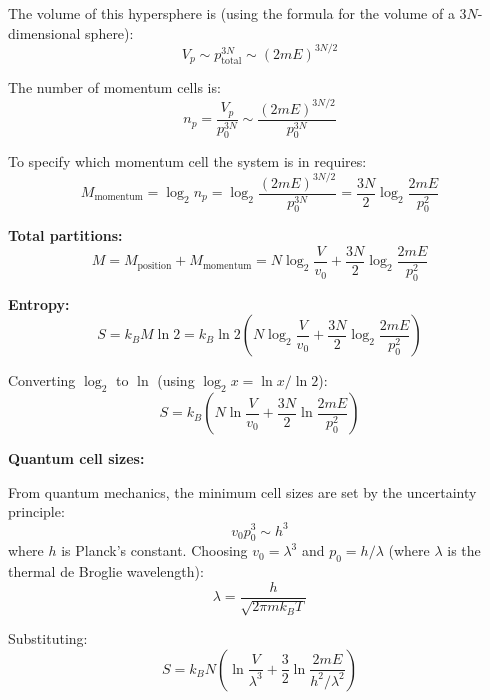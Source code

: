 \documentclass[twocolumn,10pt]{article}
\theoremstyle{definition}
\theoremstyle{remark}
\begin{document}
The volume of this hypersphere is (using the formula for the volume of a $3N$-dimensional sphere):
\begin{equation}
V_p \sim p_{\text{total}}^{3N} \sim (2mE)^{3N/2}
\end{equation}

The number of momentum cells is:
\begin{equation}
n_p = \frac{V_p}{p_0^{3N}} \sim \frac{(2mE)^{3N/2}}{p_0^{3N}}
\end{equation}

To specify which momentum cell the system is in requires:
\begin{equation}
M_{\text{momentum}} = \log_2 n_p = \log_2 \frac{(2mE)^{3N/2}}{p_0^{3N}} = \frac{3N}{2} \log_2 \frac{2mE}{p_0^2}
\end{equation}

\vspace{0.2cm}
\noindent\textbf{Total partitions:}
\begin{equation}
M = M_{\text{position}} + M_{\text{momentum}} = N \log_2 \frac{V}{v_0} + \frac{3N}{2} \log_2 \frac{2mE}{p_0^2}
\end{equation}

\vspace{0.2cm}
\noindent\textbf{Entropy:}
\begin{equation}
S = k_B M \ln 2 = k_B \ln 2 \left( N \log_2 \frac{V}{v_0} + \frac{3N}{2} \log_2 \frac{2mE}{p_0^2} \right)
\end{equation}

Converting $\log_2$ to $\ln$ (using $\log_2 x = \ln x / \ln 2$):
\begin{equation}
S = k_B \left( N \ln \frac{V}{v_0} + \frac{3N}{2} \ln \frac{2mE}{p_0^2} \right)
\end{equation}

\vspace{0.2cm}
\noindent\textbf{Quantum cell sizes:}

From quantum mechanics, the minimum cell sizes are set by the uncertainty principle:
\begin{equation}
v_0 p_0^3 \sim h^3
\end{equation}
where $h$ is Planck's constant. Choosing $v_0 = \lambda^3$ and $p_0 = h/\lambda$ (where $\lambda$ is the thermal de Broglie wavelength):
\begin{equation}
\lambda = \frac{h}{\sqrt{2\pi m k_B T}}
\end{equation}

Substituting:
\begin{equation}
S = k_B N \left( \ln \frac{V}{\lambda^3} + \frac{3}{2} \ln \frac{2mE}{h^2/\lambda^2} \right)
\end{equation}
\end{document}

